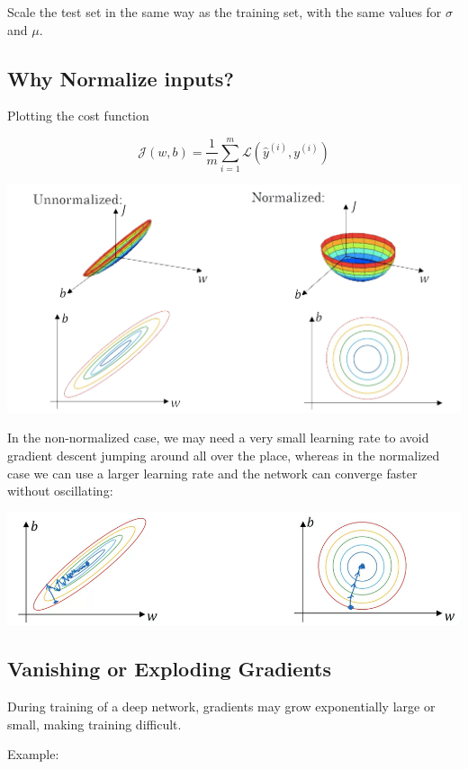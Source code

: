 Scale the test set in the same way as the training set, with the same values for $\sigma$ and $\mu$.

\newpage

\subsection*{Why Normalize inputs?}

Plotting the cost function 

\[ \mathcal{J}(w, b)= \frac{1}{m} \sum_{i=1}^m \mathcal{L}(\hat{y}^{(i)}, y^{(i)}) \]

\includegraphics{images/normalized_cost_function.png}

In the non-normalized case, we may need a very small learning rate to avoid gradient descent jumping around all over the place,
whereas in the normalized case we can use a larger learning rate and the network can converge faster without oscillating:

\includegraphics{images/normalized_gd.png}

\subsection*{Vanishing or Exploding Gradients}

During training of a deep network, gradients may grow exponentially large or small, making training difficult.

Example:

